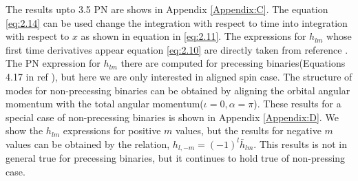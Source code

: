 \documentclass[prd,preprintnumbers,twocolumn,eqsecnum,floatfix,letter]{revtex4}
\begin{document}
The results upto 3.5 PN are shows in Appendix \ref{Appendix:C}.
The equation \ref{eq:2.14} can be used change the integration with respect to time into integration with respect to $x$ as shown in equation in \ref{eq:2.11}. The expressions for $h_{lm}$ whose first time derivatives appear equation \ref{eq:2.10} are directly taken from reference \cite{Arun2009}. The PN expression for $h_{lm}$ there are computed for precessing binaries(Equations 4.17 in ref \cite{Arun2009}), but here we are only interested in aligned spin case. The structure of modes for non-precessing binaries can be obtained by aligning the orbital angular momentum with the total angular momentum($\iota = 0, \alpha = \pi$). These results for a special case of non-precessing binaries is shown in Appendix \ref{Appendix:D}. We show the $h_{lm}$ expressions for positive $m$ values, but the results for negative $m$ values can be obtained by the relation, $h_{l, -m} = (-1)^l \bar{h}_{lm}$. This results is not in general true for precessing binaries, but it continues to hold true of non-pressing case.
\end{document}
